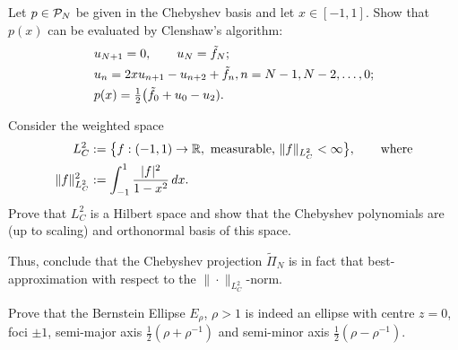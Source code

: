 

   

\begin{exercise}
   \label{exr:poly:clenshaw}
   Let $p \in \mathcal{P}_N$ be given in the Chebyshev basis and let $x \in [-1,1]$. 
   Show that $p(x)$ can be evaluated by Clenshaw's algorithm:
   \begin{align*}
      & u_{N+1} = 0, \qquad u_N = \tilde{f}_N; \\ 
      & u_n = 2 x u_{n+1} - u_{n+2} + \tilde{f}_n, n = N-1, N-2, \dots, 0; \\ 
      & p(x) = {\textstyle \frac{1}{2}} \big( \tilde{f}_0 + u_0 - u_2).
   \end{align*}
\end{exercise}

\begin{exercise}[Orthogonality of $T_k$]
   Consider the weighted space 
   \begin{align*}
      L^2_C &:= \big\{ f : (-1,1) \to \mathbb{R}, \text{ measurable, } 
            \|f\|_{L^2_C} < \infty \big\}, \qquad 
            \text{where} \\  
      \|f\|_{L^2_C}^2 &:= \int_{-1}^1 \frac{|f|^2}{1 - x^2} \,dx.
   \end{align*}
   Prove that $L^2_C$ is a Hilbert space and show that the Chebyshev 
   polynomials are (up to scaling) and orthonormal basis of this space. 

   Thus, conclude that the Chebyshev projection $\tilde\Pi_N$ is in fact that 
   best-approximation with respect to the $\|\cdot\|_{L^2_C}$-norm. 
\end{exercise}

\begin{exercise} Prove that the Bernstein Ellipse $E_\rho$,
   $\rho > 1$ is indeed an ellipse with centre $z = 0$, foci $\pm 1$, semi-major
   axis $\frac12 (\rho+\rho^{-1})$ and semi-minor axis $\frac12
   (\rho-\rho^{-1})$.
\end{exercise}




